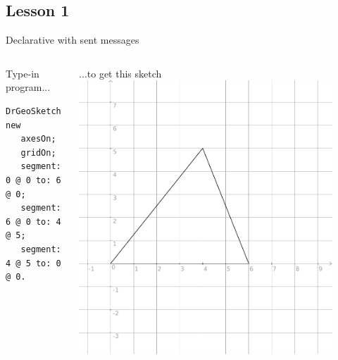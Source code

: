 \documentclass{beamer}
\begin{document}
\subsection{Lesson 1}
\begin{frame}[fragile]{Declarative with sent messages\cite{lesson1}}
\begin{columns}[t]
  \begin{column}{0.5\textwidth}
    Type-in program...
    \vspace*{10pt}
    \fontsize{9pt}{8pt}\selectfont
    \begin{lstlisting}[language=Smalltalk]
DrGeoSketch new
   axesOn;
   gridOn;
   segment: 0 @ 0 to: 6 @ 0;
   segment: 6 @ 0 to: 4 @ 5;
   segment: 4 @ 5 to: 0 @ 0.
 \end{lstlisting}
\end{column}    
    \begin{column}{0.5\textwidth}
      ...to get this sketch
      \includegraphics[width=0.9\textwidth]{lesson1.pdf}
    \end{column}  
  \end{columns}  
\end{frame}
%
\end{document}
